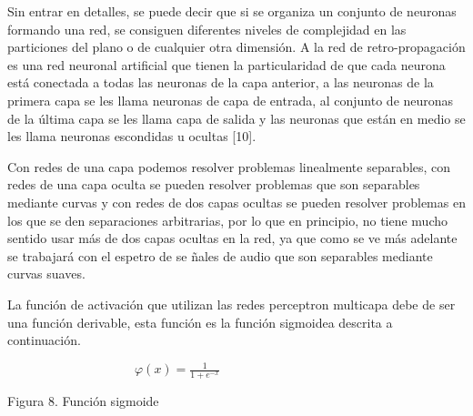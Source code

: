 Sin entrar en detalles, se puede decir que si se organiza un conjunto de
neuronas formando una red, se consiguen diferentes niveles de complejidad en
las particiones del plano o de cualquier otra dimensi\'{o}n. A la red de
retro-propagaci\'{o}n es una red neuronal artificial que tienen la
particularidad de que cada neurona est\'{a} conectada a todas las neuronas
de la capa anterior, a las neuronas de la primera capa se les llama neuronas
de capa de entrada, al conjunto de neuronas de la \'{u}ltima capa se les
llama capa de salida y las neuronas que est\'{a}n en medio se les llama
neuronas escondidas u ocultas [10].

Con redes de una capa podemos resolver problemas linealmente separables, con
redes de una capa oculta se pueden resolver problemas que son separables
mediante curvas y con redes de dos capas ocultas se pueden resolver
problemas en los que se den separaciones arbitrarias, por lo que en
principio, no tiene mucho sentido usar m\'{a}s de dos capas ocultas en la
red, ya que como se ve m\'{a}s adelante se trabajar\'{a} con el espetro de se%
\~{n}ales de audio que son separables mediante curvas suaves.

La funci\'{o}n de activaci\'{o}n que utilizan las redes perceptron multicapa
debe de ser una funci\'{o}n derivable, esta funci\'{o}n es la funci\'{o}n
sigmoidea descrita a continuaci\'{o}n.$\qquad \qquad \qquad \qquad \qquad
\qquad $

\begin{center}
$\qquad \qquad \qquad \qquad \qquad \varphi (x)=\frac{1}{1+e^{-x}}$

\qquad \qquad {}

Figura 8. Funci\'{o}n sigmoide
\end{center}

